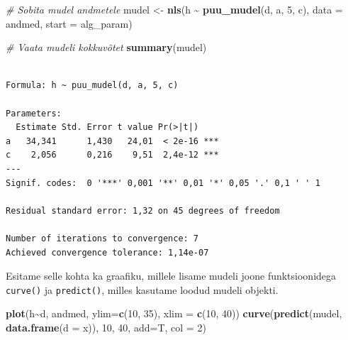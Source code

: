 \documentclass[
]{book}
\newenvironment{Shaded}{\begin{snugshade}}{\end{snugshade}}
\newcommand{\AttributeTok}[1]{\textcolor[rgb]{0.13,0.29,0.53}{#1}}
\newcommand{\CommentTok}[1]{\textcolor[rgb]{0.56,0.35,0.01}{\textit{#1}}}
\newcommand{\DecValTok}[1]{\textcolor[rgb]{0.00,0.00,0.81}{#1}}
\newcommand{\FunctionTok}[1]{\textcolor[rgb]{0.13,0.29,0.53}{\textbf{#1}}}
\newcommand{\NormalTok}[1]{#1}
\newcommand{\OtherTok}[1]{\textcolor[rgb]{0.56,0.35,0.01}{#1}}
\newcommand{\SpecialCharTok}[1]{\textcolor[rgb]{0.81,0.36,0.00}{\textbf{#1}}}
\renewenvironment{Shaded} {\begin{snugshade}\footnotesize} {\end{snugshade}}
\begin{document}
\begin{Shaded}
\begin{Highlighting}[]
\CommentTok{\# Sobita mudel andmetele}
\NormalTok{mudel }\OtherTok{\textless{}{-}} \FunctionTok{nls}\NormalTok{(h }\SpecialCharTok{\textasciitilde{}} \FunctionTok{puu\_mudel}\NormalTok{(d, a, }\DecValTok{5}\NormalTok{, c), }\AttributeTok{data =}\NormalTok{ andmed, }\AttributeTok{start =}\NormalTok{ alg\_param)}
\end{Highlighting}
\end{Shaded}

\begin{Shaded}
\begin{Highlighting}[]
\CommentTok{\# Vaata mudeli kokkuvõtet}
\FunctionTok{summary}\NormalTok{(mudel)}
\end{Highlighting}
\end{Shaded}

\begin{verbatim}

Formula: h ~ puu_mudel(d, a, 5, c)

Parameters:
  Estimate Std. Error t value Pr(>|t|)    
a   34,341      1,430   24,01  < 2e-16 ***
c    2,056      0,216    9,51  2,4e-12 ***
---
Signif. codes:  0 '***' 0,001 '**' 0,01 '*' 0,05 '.' 0,1 ' ' 1

Residual standard error: 1,32 on 45 degrees of freedom

Number of iterations to convergence: 7 
Achieved convergence tolerance: 1,14e-07
\end{verbatim}

Esitame selle kohta ka graafiku, millele lisame mudeli joone funktsioonidega \texttt{curve()} ja \texttt{predict()}, milles kasutame loodud mudeli objekti.

\begin{Shaded}
\begin{Highlighting}[]
\FunctionTok{plot}\NormalTok{(h}\SpecialCharTok{\textasciitilde{}}\NormalTok{d, andmed, }\AttributeTok{ylim=}\FunctionTok{c}\NormalTok{(}\DecValTok{10}\NormalTok{, }\DecValTok{35}\NormalTok{), }\AttributeTok{xlim =} \FunctionTok{c}\NormalTok{(}\DecValTok{10}\NormalTok{, }\DecValTok{40}\NormalTok{))}
\FunctionTok{curve}\NormalTok{(}\FunctionTok{predict}\NormalTok{(mudel, }\FunctionTok{data.frame}\NormalTok{(}\AttributeTok{d =}\NormalTok{ x)), }\DecValTok{10}\NormalTok{, }\DecValTok{40}\NormalTok{, }\AttributeTok{add=}\NormalTok{T, }\AttributeTok{col =} \DecValTok{2}\NormalTok{)}
\end{Highlighting}
\end{Shaded}
\end{document}

